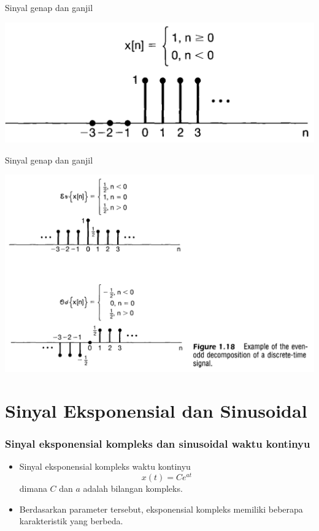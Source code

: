 \documentclass[pdflatex,compress,mathserif]{beamer}
\begin{document}
\begin{frame}{Sinyal genap dan ganjil}
	\begin{center}
		\includegraphics[width=0.8\linewidth]{img/img29}
	\end{center}
\end{frame}

\begin{frame}{Sinyal genap dan ganjil}
	\begin{center}
		\includegraphics[height=0.8\textheight]{img/img30}
	\end{center}
\end{frame}

\section{Sinyal Eksponensial dan Sinusoidal}

\begin{frame}
	\frametitle{Sinyal eksponensial kompleks dan sinusoidal waktu kontinyu}
	\begin{itemize}
		\item Sinyal eksponensial kompleks waktu kontinyu
		$$ x(t) = Ce^{at} $$ dimana $ C $ dan $ a $ adalah bilangan kompleks.
		\item Berdasarkan parameter tersebut, eksponensial kompleks memiliki beberapa karakteristik yang berbeda.
	\end{itemize}
\end{frame}
\end{document}
